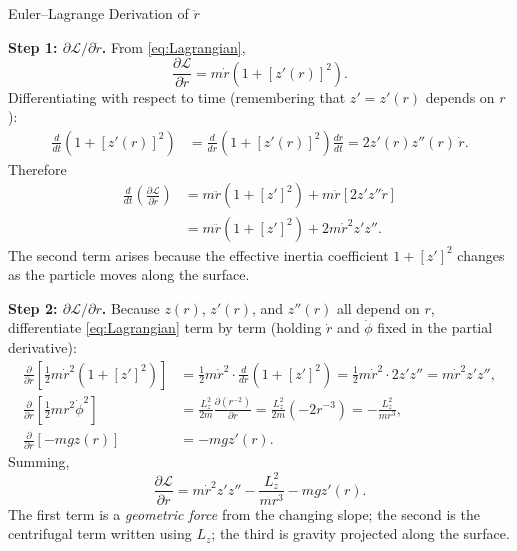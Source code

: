 \documentclass[11pt,letterpaper]{article}
\newcommand{\parhead}[1]{\par\medskip\noindent\textbf{#1}\ignorespaces}
\begin{document}
\begin{derivationbox}{Euler--Lagrange Derivation of $\ddot{r}$}
\parhead{Step 1: $\partial\mathcal{L}/\partial\dot{r}$.}
From \eqref{eq:Lagrangian},
\begin{equation}
    \frac{\partial\mathcal{L}}{\partial\dot{r}}
    = m\dot{r}\left(1 + [z'(r)]^2\right).
\end{equation}
Differentiating with respect to time (remembering that $z'=z'(r)$ depends on $r$):
\begin{align}
    \frac{d}{dt}\left(1+[z'(r)]^2\right)
    &= \frac{d}{dr}\left(1+[z'(r)]^2\right)\frac{dr}{dt}
     = 2z'(r)z''(r)\,\dot{r}.
\end{align}
Therefore
\begin{align}
    \frac{d}{dt}\left(\frac{\partial\mathcal{L}}{\partial\dot{r}}\right)
    &= m\ddot{r}\left(1+[z']^2\right)
     + m\dot{r}\left[2z' z'' \dot{r}\right] \nonumber \\
    &= m\ddot{r}\left(1+[z']^2\right) + 2m\dot{r}^2 z' z''.
    \label{eq:dLdrdot}
\end{align}
The second term arises because the effective inertia coefficient $1+[z']^2$ changes as the particle moves along the surface.

\parhead{Step 2: $\partial\mathcal{L}/\partial r$.}
Because $z(r)$, $z'(r)$, and $z''(r)$ all depend on $r$, differentiate \eqref{eq:Lagrangian} term by term (holding $\dot{r}$ and $\dot{\phi}$ fixed in the partial derivative):
\begin{align}
    \frac{\partial}{\partial r}\left[\frac{1}{2}m\dot{r}^2\left(1+[z']^2\right)\right]
    &= \frac{1}{2}m\dot{r}^2 \cdot \frac{d}{dr}\left(1+[z']^2\right)
     = \frac{1}{2}m\dot{r}^2 \cdot 2z' z''
     = m\dot{r}^2 z' z'', \\
    \frac{\partial}{\partial r}\left[\frac{1}{2}m r^2 \dot{\phi}^2\right]
    &= \frac{L_z^2}{2m}\frac{\partial(r^{-2})}{\partial r}
     = \frac{L_z^2}{2m}(-2r^{-3})
     = -\frac{L_z^2}{m r^3}, \\
    \frac{\partial}{\partial r}\left[-mgz(r)\right]
    &= -mgz'(r).
\end{align}
Summing,
\begin{equation}\label{eq:dLdr}
    \frac{\partial\mathcal{L}}{\partial r}
    = m\dot{r}^2 z' z'' - \frac{L_z^2}{m r^3} - mgz'(r).
\end{equation}
The first term is a \emph{geometric force} from the changing slope; the second is the centrifugal term written using $L_z$; the third is gravity projected along the surface.


\end{derivationbox}
\end{document}
